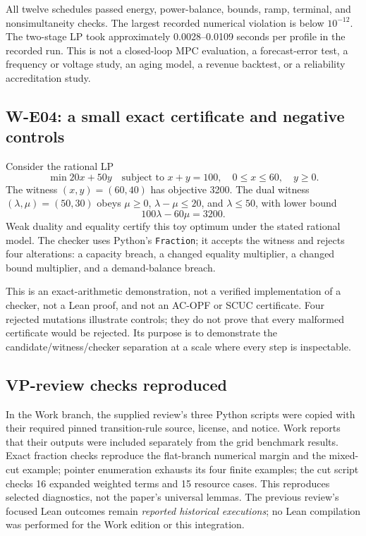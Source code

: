 \documentclass[11pt,letterpaper]{article}
\begin{document}
All twelve schedules passed energy, power-balance, bounds, ramp, terminal, and nonsimultaneity checks. The largest recorded numerical violation is below $10^{-12}$. The two-stage LP took approximately 0.0028--0.0109 seconds per profile in the recorded run. This is not a closed-loop MPC evaluation, a forecast-error test, a frequency or voltage study, an aging model, a revenue backtest, or a reliability accreditation study.

\subsection{W-E04: a small exact certificate and negative controls}
Consider the rational LP
\[
 \min 20x+50y\quad\text{subject to }x+y=100,\quad0\le x\le60,\quad y\ge0.
\]
The witness $(x,y)=(60,40)$ has objective 3200. The dual witness $(\lambda,\mu)=(50,30)$ obeys $\mu\ge0$, $\lambda-\mu\le20$, and $\lambda\le50$, with lower bound
\[
 100\lambda-60\mu=3200.
\]
Weak duality and equality certify this toy optimum under the stated rational model. The checker uses Python's \texttt{Fraction}; it accepts the witness and rejects four alterations: a capacity breach, a changed equality multiplier, a changed bound multiplier, and a demand-balance breach.

This is an exact-arithmetic demonstration, not a verified implementation of a checker, not a Lean proof, and not an AC-OPF or SCUC certificate. Four rejected mutations illustrate controls; they do not prove that every malformed certificate would be rejected. Its purpose is to demonstrate the candidate/witness/checker separation at a scale where every step is inspectable.

\subsection{VP-review checks reproduced}
In the Work branch, the supplied review's three Python scripts were copied with their required pinned transition-rule source, license, and notice. Work reports that their outputs were included separately from the grid benchmark results. Exact fraction checks reproduce the flat-branch numerical margin and the mixed-cut example; pointer enumeration exhausts its four finite examples; the cut script checks 16 expanded weighted terms and 15 resource cases. This reproduces selected diagnostics, not the paper's universal lemmas. The previous review's focused Lean outcomes remain \emph{reported historical executions}; no Lean compilation was performed for the Work edition or this integration.
\end{document}
